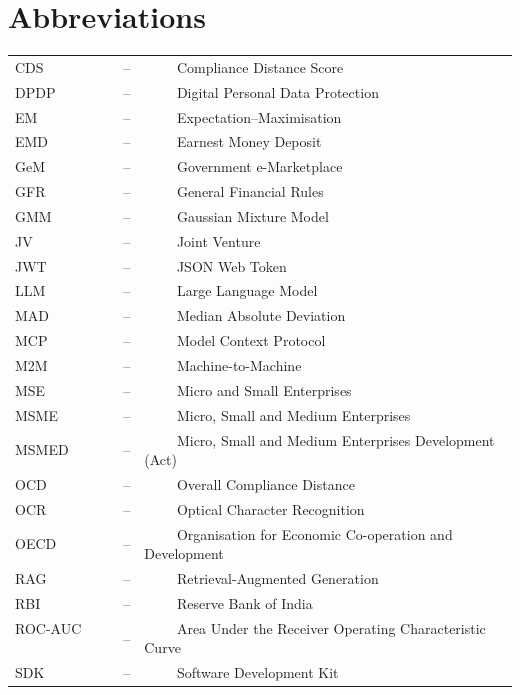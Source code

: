 \documentclass[a4paper, 12pt]{report}
\theoremstyle{definition}
\begin{document}
\section*{{\huge Abbreviations}\hfill} 
\vspace{1.2cm}
\begin{tabular}{lll}
CDS ~~~~&--&~~~~ Compliance Distance Score\\
DPDP ~~~~&--&~~~~ Digital Personal Data Protection\\
EM ~~~~&--&~~~~ Expectation--Maximisation\\
EMD ~~~~&--&~~~~ Earnest Money Deposit\\
GeM ~~~~&--&~~~~ Government e-Marketplace\\
GFR ~~~~&--&~~~~ General Financial Rules\\
GMM ~~~~&--&~~~~ Gaussian Mixture Model\\
JV ~~~~&--&~~~~ Joint Venture\\
JWT ~~~~&--&~~~~ JSON Web Token\\
LLM ~~~~&--&~~~~ Large Language Model\\
MAD ~~~~&--&~~~~ Median Absolute Deviation\\
MCP ~~~~&--&~~~~ Model Context Protocol\\
M2M ~~~~&--&~~~~ Machine-to-Machine\\
MSE ~~~~&--&~~~~ Micro and Small Enterprises\\
MSME ~~~~&--&~~~~ Micro, Small and Medium Enterprises\\
MSMED ~~~~&--&~~~~ Micro, Small and Medium Enterprises Development (Act)\\
OCD ~~~~&--&~~~~ Overall Compliance Distance\\
OCR ~~~~&--&~~~~ Optical Character Recognition\\
OECD ~~~~&--&~~~~ Organisation for Economic Co-operation and Development\\
RAG ~~~~&--&~~~~ Retrieval-Augmented Generation\\
RBI ~~~~&--&~~~~ Reserve Bank of India\\
ROC-AUC ~~~~&--&~~~~ Area Under the Receiver Operating Characteristic Curve\\
SDK ~~~~&--&~~~~ Software Development Kit\\
\end{tabular}
\newpage
\end{document}
